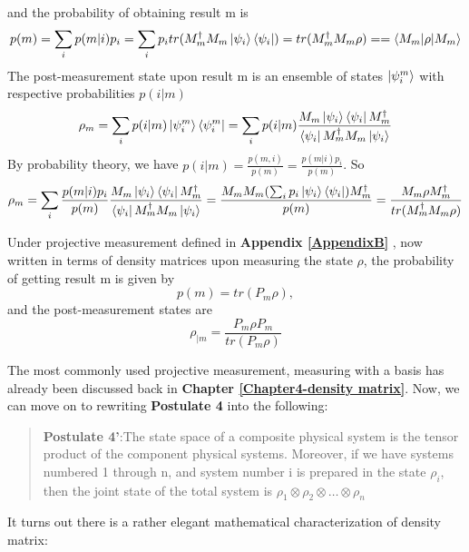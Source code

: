     and the probability of obtaining result m is
    \begin{equation}
        p(m)=\sum_i p(m|i)p_i=\sum_i p_i tr(M_m^\dagger M_m \ket{\psi_i}\bra{\psi_i})=tr(M_m^\dagger M_m \rho)==\braket{M_m| \rho |M_m}
    \end{equation}
    The post-measurement state upon result m is an ensemble of states $\ket{\psi_i^m}$ with respective probabilities $p(i|m)$
    \begin{equation}
        \rho_m = \sum_i p(i|m)\ket{\psi_i^m}\bra{\psi_i^m}=\sum_i p(i|m)\frac{M_m \ket{\psi_i}\bra{\psi_i}M_m^\dagger}{\bra{\psi_i}M_m^\dagger M_m \ket{\psi_i}}
    \end{equation}
    By probability theory, we have $p(i|m)=\frac{p(m,i)}{p(m)}=\frac{p(m|i)p_i}{p(m)}$. So
    \begin{equation}
        \rho_m=\sum_i \frac{p(m|i)p_i}{p(m)}\frac{M_m \ket{\psi_i}\bra{\psi_i}M_m^\dagger}{\bra{\psi_i}M_m^\dagger M_m \ket{\psi_i}}=\frac{M_m M_m (\sum_i p_i \ket{\psi_i}\bra{\psi_i})M_m^\dagger}{p(m)}=\frac{M_m \rho M_m^\dagger}{tr(M_m^\dagger M_m \rho)}
    \end{equation}

\bigskip
Under projective measurement defined in \textbf{Appendix \ref{AppendixB}}
, now written in terms of density matrices upon measuring the state $\rho$, the probability of getting result m is given by
\begin{equation}
    p(m)=tr(P_m \rho),
\end{equation}
and the post-measurement states are
\begin{equation}
    \rho_{|m}=\frac{P_m \rho P_m}{tr(P_m \rho)}
\end{equation}

The most commonly used projective measurement, measuring with a basis has already been discussed back in \textbf{Chapter \ref{Chapter4-density matrix}}. Now, we can move on to rewriting \textbf{Postulate 4} into the following:

\bigskip
\begin{quote}
    \textbf{Postulate 4'}:The state space of a composite physical system is the tensor product of the component physical systems. Moreover, if we have systems numbered 1 through n, and system number i is prepared in the state $\rho_i$, then the joint state of the total system is $\rho_1 \otimes \rho_2 \otimes \hdots \otimes \rho_n$
\end{quote}

It turns out there is a rather elegant mathematical characterization of density matrix:

